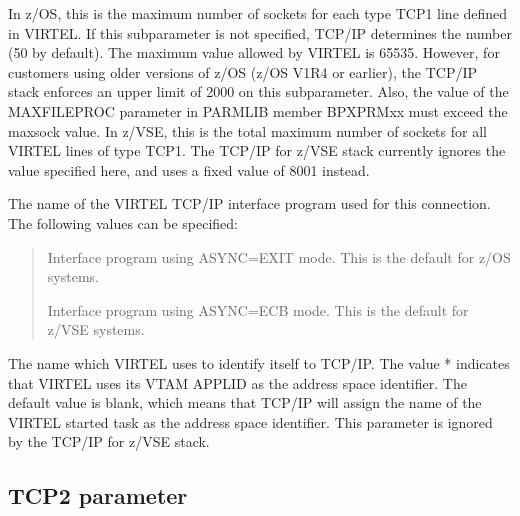 \documentclass[letterpaper,10pt,english]{sphinxmanual}
\begin{document}
\sphinxAtStartPar
{} \sphinxhyphen{} In z/OS, this is the maximum number of sockets for each type TCP1 line defined in VIRTEL. If this subparameter is not specified, TCP/IP determines the number (50 by default). The maximum value allowed by VIRTEL is 65535. However, for customers using older versions of z/OS (z/OS V1R4 or earlier), the TCP/IP stack enforces an upper limit of 2000 on this subparameter. Also, the value of the MAXFILEPROC parameter in PARMLIB member BPXPRMxx must exceed the maxsock value. In z/VSE, this is the total maximum number of sockets for all VIRTEL lines of type TCP1. The TCP/IP for z/VSE stack currently ignores the value specified here, and uses a fixed value of 8001 instead.

\sphinxAtStartPar
{} \sphinxhyphen{} The name of the VIRTEL TCP/IP interface program used for this connection. The following values can be specified:
\begin{quote}

\sphinxAtStartPar
{} \sphinxhyphen{} Interface program using ASYNC=EXIT mode. This is the default for z/OS systems.

\sphinxAtStartPar
{} \sphinxhyphen{} Interface program using ASYNC=ECB mode. This is the default for z/VSE systems.
\end{quote}

\sphinxAtStartPar
{} \sphinxhyphen{} The name which VIRTEL uses to identify itself to TCP/IP. The value * indicates that VIRTEL uses its VTAM APPLID as the address space identifier. The default value is blank, which means that TCP/IP will assign the name of the VIRTEL started task as the address space identifier. This parameter is ignored by the TCP/IP for z/VSE stack.


\subsection{TCP2 parameter}
\label{\detokenize{Installation_Guide:tcp2-parameter}}
\begin{sphinxVerbatim}[commandchars=\\\{\}]
    
\PYG{p}{[}\PYG{p}{]}\PYG{p}{[}\PYG{p}{]}\PYG{p}{[}\PYG{p}{]}\PYG{p}{[}\PYG{p}{]}\PYG{p}{[}\PYG{p}{]}
\end{sphinxVerbatim}
\end{document}
